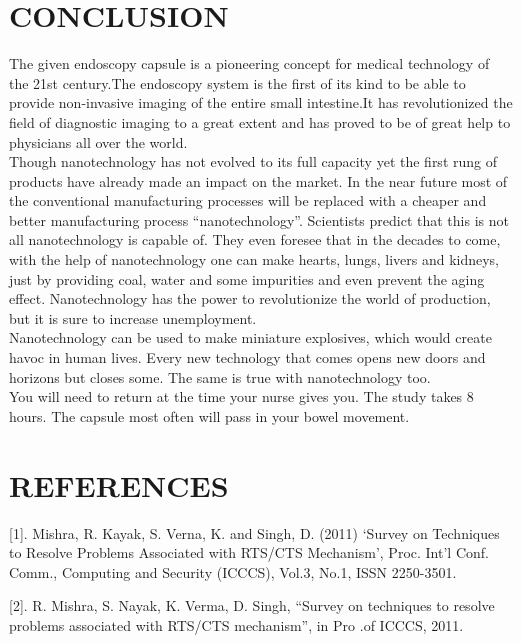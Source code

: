 \documentclass{article}
\begin{document}
\section{CONCLUSION}
The given endoscopy capsule is a pioneering concept for medical technology of the 21st century.The endoscopy system is the first of its kind to be able to provide non-invasive imaging of the entire small intestine.It has revolutionized the field of diagnostic imaging to a great extent and has proved to be of great help to physicians all over the world.
\\Though nanotechnology has not evolved to its full capacity yet the first rung of products have already made an impact on the market. In the near future most of the conventional manufacturing processes will be replaced with a cheaper and better manufacturing process “nanotechnology”. Scientists predict that this is not all nanotechnology is capable of. They even foresee that in the decades to come, with the help of nanotechnology one can make hearts, lungs, livers and kidneys, just by providing coal, water and some impurities and even prevent the aging effect. Nanotechnology has the power to revolutionize the world of production, but it is sure to increase unemployment.
\\Nanotechnology can be used to make miniature explosives, which would create havoc in human lives. Every new technology that comes opens new doors and horizons but closes some. The same is true with nanotechnology too.
\\You will need to return at the time your nurse gives you. The study takes 8 hours. The capsule most often will pass in your bowel movement.
 \section{REFERENCES}
 
 [1]. Mishra, R. Kayak, S. Verna, K. and Singh, D. (2011) ‘Survey on Techniques to Resolve Problems Associated with RTS/CTS Mechanism’, Proc. Int’l Conf. Comm., Computing and Security (ICCCS), Vol.3, No.1, ISSN 2250-3501.
 
 [2]. R. Mishra, S. Nayak, K. Verma, D. Singh, “Survey on techniques to resolve problems associated with RTS/CTS mechanism”, in Pro .of ICCCS, 2011.
\end{document}
